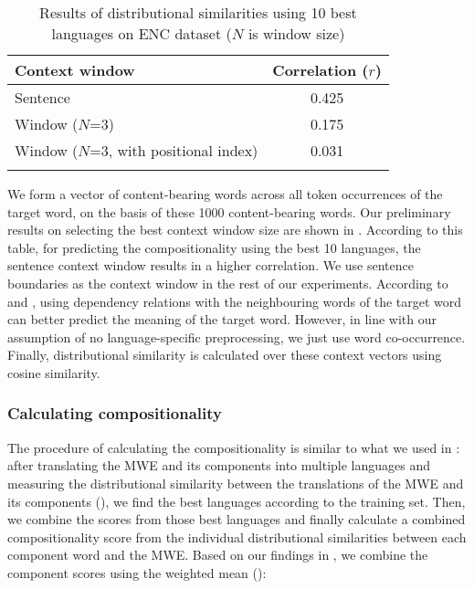 \documentclass[output=paper
,modfonts
,nonflat]{langsci/langscibook}
\begin{document}
\begin{table}[t]
\begin{center}
\begin{tabular}{l c} 
\lsptoprule
Context window &Correlation ($r$) \\\midrule
Sentence & 0.425 \\
Window ($N$=3) & 0.175 \\
Window ($N$=3, with positional index) & 0.031 \\
\lspbottomrule
\end{tabular}
\caption{\label{tab:ds:premResult} Results of distributional similarities using 10 best languages on ENC dataset ($N$ is window size)}
\end{center}
\end{table}


We form a vector of content-bearing words across all token occurrences
of the target word, on the basis of these 1000 content-bearing words. Our
preliminary results on selecting the best context window size are
shown in . According to this table, for
predicting the compositionality using the best 10 languages, the
sentence context window results in a higher correlation. We use
sentence boundaries as the context window in the rest of our
experiments. According to \citet{weeds2003} and
\citet{Pado:Lapata:2007}, using dependency relations with the
neighbouring words of the target word can better predict the meaning
of the target word. However, in line with our assumption of no
language-specific preprocessing, we just use word
co-occurrence. Finally, distributional similarity is calculated over
these context vectors using cosine similarity.

\subsubsection{Calculating compositionality}
\label{sec:computing-compositionality}
The procedure of calculating the compositionality is similar to what
we used in : after translating the MWE and its
components into multiple languages and measuring the distributional
similarity between the translations of the MWE and its components
(), we find the best languages according to the
training set. Then, we combine the scores from those best languages
and finally calculate a combined compositionality score from the
individual distributional similarities between each component word and
the MWE. Based on our findings in , we combine the
component scores using the weighted mean ():
\end{document}
